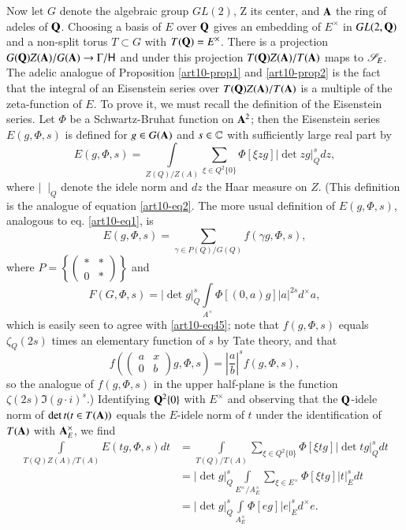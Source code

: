Now let $G$ denote the algebraic group $GL(2)$, Z its center, and $\mathbf{A}$ the ring of adeles of $\mathbf{Q}$. Choosing a basis of $E$ over $\mathbf{Q}$ gives an embedding of $E^\times$ in $GL (2, \mathbf{Q})$ and a non-split torus $T \subset G$ with $T (\mathbf{Q}) = E^{\times}$. There is a projection $G (\mathbf{Q}) Z(\mathbf{A})/ G (\mathbf{A}) \to \Gamma / \mathsf{H}$ and under this projection $T (\mathbf{Q}) Z (\mathbf{A}) / T (\mathbf{A})$ maps to $\mathscr{S}_E$. The adelic analogue of Proposition \ref{art10-prop1} and \ref{art10-prop2} is the fact that the integral of an Eisenstein series over $T (\mathbf{Q})Z (\mathbf{A}) / T (\mathbf{A})$ is a multiple of the zeta-function of $E$. To prove it, we must recall the definition of the Eisenstein series. Let $\Phi$ be a Schwartz-Bruhat function on $\mathbf{A}^2$; then the Eisenstein series $E (g, \Phi, s)$ is defined for $g \in G(\mathbf{A})$ and $s \in \mathbb{C}$ with sufficiently large real part by 
\begin{equation*}
E (g , \Phi, s) = \int\limits_{Z (Q) / Z (A)} \sum\limits_{\xi \in Q^2 \{0\}} \Phi [\xi z g] |\det z g|^s_Q dz, \tag{45} \label{art10-eq45}
\end{equation*}
where $|{\;\;}|_Q$ denote the idele norm and $dz$ the Haar measure on $Z$. (This definition is the analogue of equation \eqref{art10-eq2}. The more usual definition of $E(g, \Phi, s)$, analogous to eq. \eqref{art10-eq1}, is
$$
E (g, \Phi , s) = \sum\limits_{ \gamma \in P (Q) / G (Q)} f (\gamma g, \Phi , s),
$$
where $P = \left\{\left(\begin{matrix}\ast & \ast \\ 0 & \ast \end{matrix}\right)\right\}$ and 
$$
F (G, \Phi, s) = |\det g|^s_Q \int\limits_{A^\times } \Phi [(0, a)g]|a|^{2s} d^\times a,
$$
which is easily seen to agree with \eqref{art10-eq45}; note that $f(g, \Phi, s)$ equals $\zeta_Q (2s)$ times an elementary function of $s$ by Tate theory, and that 
$$
f\left(\left(\begin{matrix} 
a & x \\ 0 & b
\end{matrix}
\right) g, \Phi, s\right) =  \left|\dfrac{a}{b} \right|^s f(g, \Phi, s),
$$ 
so the analogue of $f (g, \Phi, s)$ in the upper half-plane is the function $\zeta(2s) \Im (g \cdot i)^s$.)  Identifying $\mathbf{Q}^2 \{0\}$ with $E^\times$ and observing that the $\mathbf{Q}$-idele norm of $\det t (t \in T (\mathbf{A}))$ equals the $E$-idele norm of $t$ under the identification of $T (\mathbf{A})$ with $\mathbf{A}_E^\times$, we find 
\begin{align*}
\int\limits_{T(Q) Z(A)/ T (A)}  E(tg , \Phi, s) dt & =  \int\limits_{T (Q)/ T (A)} \sum\limits_{\xi \in Q^2 \{0\}} \Phi [\xi t g ] |\det tg|^s_Q dt\\
& = |\det g|^s_Q \int\limits_{E^\times / A^\times_E} \sum\limits_{\xi \in E^\times} \Phi [\xi t g] |t|^s_E dt \\
& = |\det g|^s_Q \int\limits_{A^\times_E} \Phi [eg] |e|^s_E d^\times e. 
 \end{align*}
